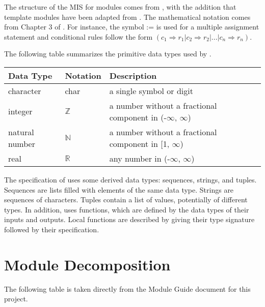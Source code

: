 \documentclass[12pt, titlepage]{article}
\begin{document}

The structure of the MIS for modules comes from \citet{HoffmanAndStrooper1995},
with the addition that template modules have been adapted from
\cite{GhezziEtAl2003}.  The mathematical notation comes from Chapter 3 of
\citet{HoffmanAndStrooper1995}.  For instance, the symbol := is used for a
multiple assignment statement and conditional rules follow the form $(c_1
\Rightarrow r_1 | c_2 \Rightarrow r_2 | ... | c_n \Rightarrow r_n )$.

The following table summarizes the primitive data types used by . 

\begin{center}
\renewcommand{\arraystretch}{1.2}
\noindent 
\begin{tabular}{l l p{7.5cm}} 
\toprule 
\textbf{Data Type} & \textbf{Notation} & \textbf{Description}\\ 
\midrule
character & char & a single symbol or digit\\
integer & $\mathbb{Z}$ & a number without a fractional component in (-$\infty$, $\infty$) \\
natural number & $\mathbb{N}$ & a number without a fractional component in [1, $\infty$) \\
real & $\mathbb{R}$ & any number in (-$\infty$, $\infty$)\\
\bottomrule
\end{tabular} 
\end{center}

\noindent
The specification of  uses some derived data types: sequences, strings, and
tuples. Sequences are lists filled with elements of the same data type. Strings
are sequences of characters. Tuples contain a list of values, potentially of
different types. In addition,  uses functions, which
are defined by the data types of their inputs and outputs. Local functions are
described by giving their type signature followed by their specification.

\section{Module Decomposition}

The following table is taken directly from the Module Guide document for this project.
\end{document}
